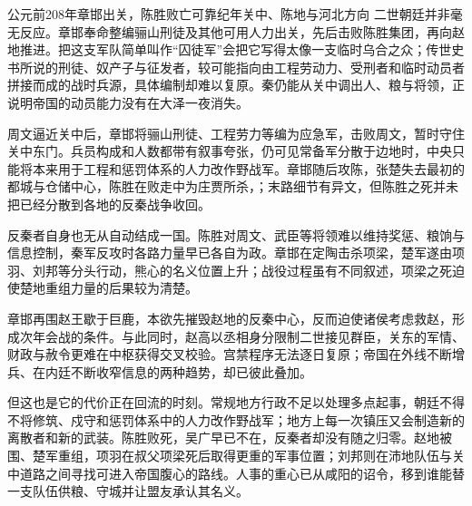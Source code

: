 \begin{event}{公元前208年}{章邯出关，陈胜败亡}{可靠纪年}{关中、陈地与河北方向}
二世朝廷并非毫无反应。章邯奉命整编骊山刑徒及其他可用人力出关，先后击败陈胜集团，再向赵地推进。把这支军队简单叫作“囚徒军”会把它写得太像一支临时乌合之众；传世史书所说的刑徒、奴产子与征发者，较可能指向由工程劳动力、受刑者和临时动员者拼接而成的战时兵源，具体编制却难以复原。秦仍能从关中调出人、粮与将领，正说明帝国的动员能力没有在大泽一夜消失。

周文逼近关中后，章邯将骊山刑徒、工程劳力等编为应急军，击败周文，暂时守住关中东门。兵员构成和人数都带有叙事夸张，仍可见常备军分散于边地时，中央只能将本来用于工程和惩罚体系的人力改作野战军。章邯随后攻陈，张楚失去最初的都城与仓储中心，陈胜在败走中为庄贾所杀，；末路细节有异文，但陈胜之死并未把已经分散到各地的反秦战争收回。

反秦者自身也无从自动结成一国。陈胜对周文、武臣等将领难以维持奖惩、粮饷与信息控制，秦军反攻时各路力量早已各自为政。章邯在定陶击杀项梁，楚军遂由项羽、刘邦等分头行动，熊心的名义位置上升；战役过程虽有不同叙述，项梁之死迫使楚地重组力量的后果较为清楚。

章邯再围赵王歇于巨鹿，本欲先摧毁赵地的反秦中心，反而迫使诸侯考虑救赵，形成次年会战的条件。与此同时，赵高以丞相身分限制二世接见群臣，关东的军情、财政与赦令更难在中枢获得交叉校验。宫禁程序无法逐日复原；帝国在外线不断增兵、在内廷不断收窄信息的两种趋势，却已彼此叠加。

但这也是它的代价正在回流的时刻。常规地方行政不足以处理多点起事，朝廷不得不将修筑、戍守和惩罚体系中的人力改作野战军；地方上每一次镇压又会制造新的离散者和新的武装。陈胜败死，吴广早已不在，反秦者却没有随之归零。赵地被围、楚军重组，项羽在叔父项梁死后取得更重的军事位置；刘邦则在沛地队伍与关中道路之间寻找可进入帝国腹心的路线。人事的重心已从咸阳的诏令，移到谁能替一支队伍供粮、守城并让盟友承认其名义。
\end{event}

